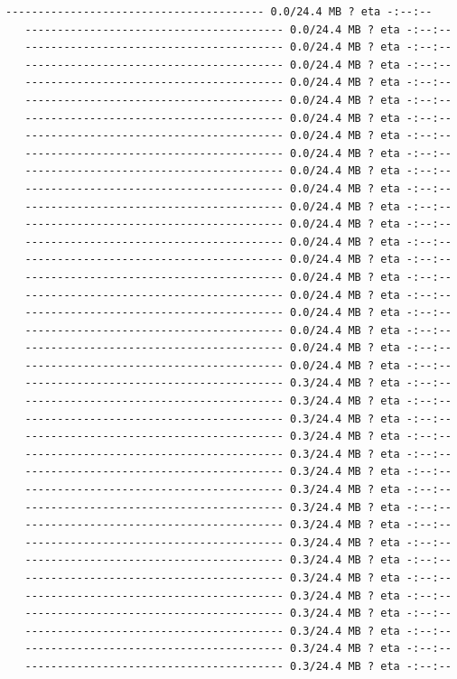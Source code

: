 \documentclass[11pt]{article}
\begin{document}
\begin{Verbatim}[commandchars=\\\{\}]
   ---------------------------------------- 0.0/24.4 MB ? eta -:--:--
   ---------------------------------------- 0.0/24.4 MB ? eta -:--:--
   ---------------------------------------- 0.0/24.4 MB ? eta -:--:--
   ---------------------------------------- 0.0/24.4 MB ? eta -:--:--
   ---------------------------------------- 0.0/24.4 MB ? eta -:--:--
   ---------------------------------------- 0.0/24.4 MB ? eta -:--:--
   ---------------------------------------- 0.0/24.4 MB ? eta -:--:--
   ---------------------------------------- 0.0/24.4 MB ? eta -:--:--
   ---------------------------------------- 0.0/24.4 MB ? eta -:--:--
   ---------------------------------------- 0.0/24.4 MB ? eta -:--:--
   ---------------------------------------- 0.0/24.4 MB ? eta -:--:--
   ---------------------------------------- 0.0/24.4 MB ? eta -:--:--
   ---------------------------------------- 0.0/24.4 MB ? eta -:--:--
   ---------------------------------------- 0.0/24.4 MB ? eta -:--:--
   ---------------------------------------- 0.0/24.4 MB ? eta -:--:--
   ---------------------------------------- 0.0/24.4 MB ? eta -:--:--
   ---------------------------------------- 0.0/24.4 MB ? eta -:--:--
   ---------------------------------------- 0.0/24.4 MB ? eta -:--:--
   ---------------------------------------- 0.0/24.4 MB ? eta -:--:--
   ---------------------------------------- 0.0/24.4 MB ? eta -:--:--
   ---------------------------------------- 0.0/24.4 MB ? eta -:--:--
   ---------------------------------------- 0.3/24.4 MB ? eta -:--:--
   ---------------------------------------- 0.3/24.4 MB ? eta -:--:--
   ---------------------------------------- 0.3/24.4 MB ? eta -:--:--
   ---------------------------------------- 0.3/24.4 MB ? eta -:--:--
   ---------------------------------------- 0.3/24.4 MB ? eta -:--:--
   ---------------------------------------- 0.3/24.4 MB ? eta -:--:--
   ---------------------------------------- 0.3/24.4 MB ? eta -:--:--
   ---------------------------------------- 0.3/24.4 MB ? eta -:--:--
   ---------------------------------------- 0.3/24.4 MB ? eta -:--:--
   ---------------------------------------- 0.3/24.4 MB ? eta -:--:--
   ---------------------------------------- 0.3/24.4 MB ? eta -:--:--
   ---------------------------------------- 0.3/24.4 MB ? eta -:--:--
   ---------------------------------------- 0.3/24.4 MB ? eta -:--:--
   ---------------------------------------- 0.3/24.4 MB ? eta -:--:--
   ---------------------------------------- 0.3/24.4 MB ? eta -:--:--
   ---------------------------------------- 0.3/24.4 MB ? eta -:--:--
   ---------------------------------------- 0.3/24.4 MB ? eta -:--:--

\end{Verbatim}
\end{document}
